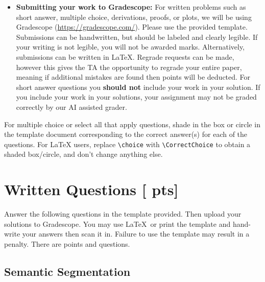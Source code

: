\documentclass[11pt,addpoints,answers]{exam}
\numberwithin{equation}{section} %
\numberwithin{figure}{section} %
\numberwithin{table}{section} %
\newcommand{\pts}[1]{\textbf{[#1 pts]}}
\begin{document}
\begin{itemize}
\item \textbf{Submitting your work to Gradescope:} For written problems such as short answer, multiple choice, derivations, proofs, or plots, we will be using Gradescope (\url{https://gradescope.com/}). Please use the provided template. Submissions can be handwritten, but should be labeled and clearly legible. If your writing is not legible, you will not be awarded marks. Alternatively, submissions can be written in LaTeX. Regrade requests can be made, however this gives the TA the opportunity to regrade your entire paper, meaning if additional mistakes are found then points will be deducted. For short answer questions you \textbf{should not} include your work in your solution.  If you include your work in your solutions, your assignment may not be graded correctly by our AI assisted grader. 



\end{itemize}


For multiple choice or select all that apply questions, shade in the box or circle in the template document corresponding to the correct answer(s) for each of the questions. For \LaTeX{} users, replace \lstinline{\choice} with \lstinline{\CorrectChoice} to obtain a shaded box/circle, and don't change anything else.


\clearpage

%
%
\section{Written Questions \pts{\numpoints{}}}
\label{sec:warmup}
Answer the following questions in the template provided.  Then upload your solutions to Gradescope. You may use \LaTeX\ or print the template and hand-write your answers then scan it in. Failure to use the template may result in a penalty. There are \numpoints{} points and \numquestions{} questions.

\subsection{Semantic Segmentation}
\end{document}
